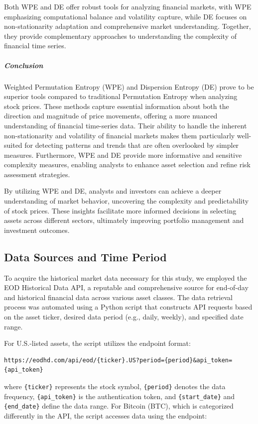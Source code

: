 Both WPE and DE offer robust tools for analyzing financial markets, with WPE emphasizing computational balance and volatility capture, while DE focuses on non-stationarity adaptation and comprehensive market understanding. Together, they provide complementary approaches to understanding the complexity of financial time series.
\subparagraph{Conclusion}
Weighted Permutation Entropy (WPE) and Dispersion Entropy (DE) prove to be superior tools compared to traditional Permutation Entropy when analyzing stock prices. These methods capture essential information about both the direction and magnitude of price movements, offering a more nuanced understanding of financial time-series data. Their ability to handle the inherent non-stationarity and volatility of financial markets makes them particularly well-suited for detecting patterns and trends that are often overlooked by simpler measures. Furthermore, WPE and DE provide more informative and sensitive complexity measures, enabling analysts to enhance asset selection and refine risk assessment strategies.

By utilizing \ac{WPE} and \ac{DE}, analysts and investors can achieve a deeper understanding of market behavior, uncovering the complexity and predictability of stock prices. These insights facilitate more informed decisions in selecting assets across different sectors, ultimately improving portfolio management and investment outcomes.
\subsection{Data Sources and Time Period}


To acquire the historical market data necessary for this study, we employed the EOD Historical Data API, a reputable and comprehensive source for end-of-day and historical financial data across various asset classes. The data retrieval process was automated using a Python script that constructs API requests based on the asset ticker, desired data period (e.g., daily, weekly), and specified date range.

For U.S.-listed assets, the script utilizes the endpoint format:

\begin{verbatim}
https://eodhd.com/api/eod/{ticker}.US?period={period}&api_token={api_token}
\end{verbatim}

where \texttt{\{ticker\}} represents the stock symbol, \texttt{\{period\}} denotes the data frequency, \texttt{\{api\_token\}} is the authentication token, and \texttt{\{start\_date\}} and \texttt{\{end\_date\}} define the data range. For Bitcoin (BTC), which is categorized differently in the API, the script accesses data using the endpoint:

